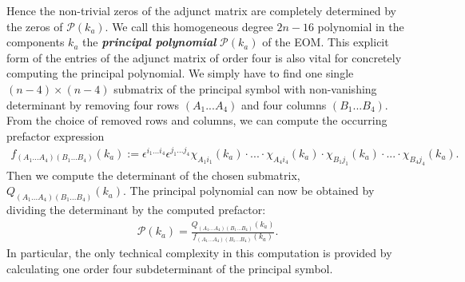 Hence the non-trivial zeros of the adjunct matrix are completely determined by the zeros of $\mathcal{P}(k_a)$. We call this homogeneous degree $2n-16$ polynomial in the components $k_a$ the \textit{\textbf{principal polynomial}} $\mathcal{P}(k_a)$ of the EOM.
This explicit form of the entries of the adjunct matrix of order four is also vital for concretely computing the principal polynomial. We simply have to find one single $(n-4) \times (n-4)$ submatrix of the principal symbol with non-vanishing determinant by removing four rows $(A_1...A_4)$ and four columns $(B_1...B_4)$. From the choice of removed rows and columns, we can compute the occurring prefactor expression 
\begin{align}\label{prefacF}
f_{(A_1...A_4)(B_1...B_4)}(k_a) := \epsilon^{i_1...i_4} \epsilon^{j_1...j_4} \chi_{A_1i_1}(k_a) \cdot ... \cdot \chi_{A_4i_4}(k_a) \cdot \chi_{B_1j_1}(k_a) \cdot ... \cdot \chi_{B_4j_4}(k_a).
\end{align}
Then we compute the determinant of the chosen submatrix, $Q_{(A_1...A_4)(B_1...B_4)}(k_a)$. The principal polynomial can now be obtained by dividing the determinant by the computed prefactor:
\begin{align}
    \mathcal{P}(k_a) = \frac{Q_{(A_1...A_4)(B_1...B_4)}(k_a)}{f_{(A_1...A_4)(B_1...B_4)}(k_a)}.
\end{align}
In particular, the only technical complexity in this computation is provided by calculating one order four subdeterminant of the principal symbol. 

